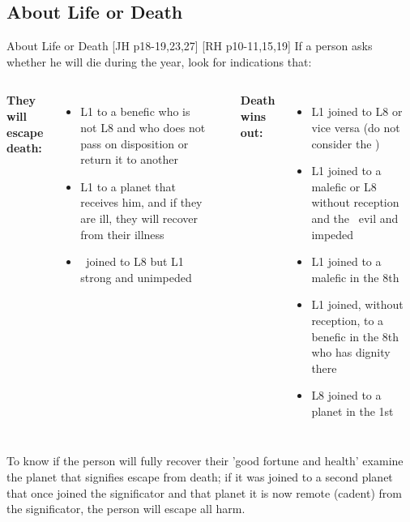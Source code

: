 \subsection{About Life or Death}
\begin{frame}[t]{About Life or Death [JH p18-19,23,27] [RH p10-11,15,19]}
If a person asks whether he will die during the year, look for indications that:\footnotemark[1]
\vspace{0.25cm}
\begin{columns}[T, onlytextwidth]
\textbf{They will escape death:}\\
\begin{itemize}
\item L1 to a benefic who is not L8 and who does not pass on disposition or return it to another 
\vspace{0.25cm}

\item L1 to a planet that receives him, and if they are ill, they will recover from their illness
\vspace{0.25cm}

\item \Moon\ joined to L8 but L1 strong and unimpeded
\end{itemize}

\rule{.1mm}{.45\textheight}

\textbf{Death wins out:}\\
\begin{itemize}
\item L1 joined to L8 or vice versa (do not consider the \Moon) 
\item L1 joined to a malefic or L8 without reception and the \Moon\ evil and impeded
\item L1 joined to a malefic in the 8th
\item L1 joined, without reception, to a benefic in the 8th who has dignity there
\item L8 joined to a planet in the 1st
\end{itemize}
\end{columns}
\vspace{0.25cm}
To know if the person will fully recover their  'good fortune and health' examine the planet that signifies escape from death; if it was joined to a second planet that once joined the significator and that planet it is now remote (cadent) from the significator, the person will escape all harm.\footnotemark[2]

\end{frame}
